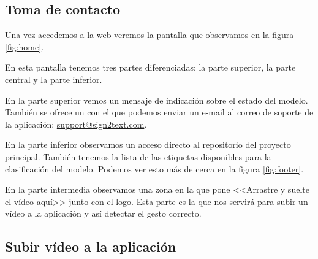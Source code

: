 \subsection{Toma de contacto}

Una vez accedemos a la web veremos la pantalla que observamos en la figura \ref{fig:home}.


En esta pantalla tenemos tres partes diferenciadas: la parte superior, la parte central y la parte inferior.

En la parte superior vemos un mensaje de indicación sobre el estado del modelo. También se ofrece un  con el que podemos enviar un e-mail al correo de soporte de la aplicación: \href{mailto://support@sign2text.com}{support@sign2text.com}.

En la parte inferior observamos un acceso directo al repositorio del proyecto principal. También tenemos la lista de las etiquetas disponibles para la clasificación del modelo. Podemos ver esto más de cerca en la figura \ref{fig:footer}.


En la parte intermedia observamos una zona en la que pone <<Arrastre y suelte el vídeo aquí>> junto con el logo. Esta parte es la que nos servirá para subir un vídeo a la aplicación y así detectar el gesto correcto.

\subsection{Subir vídeo a la aplicación}

